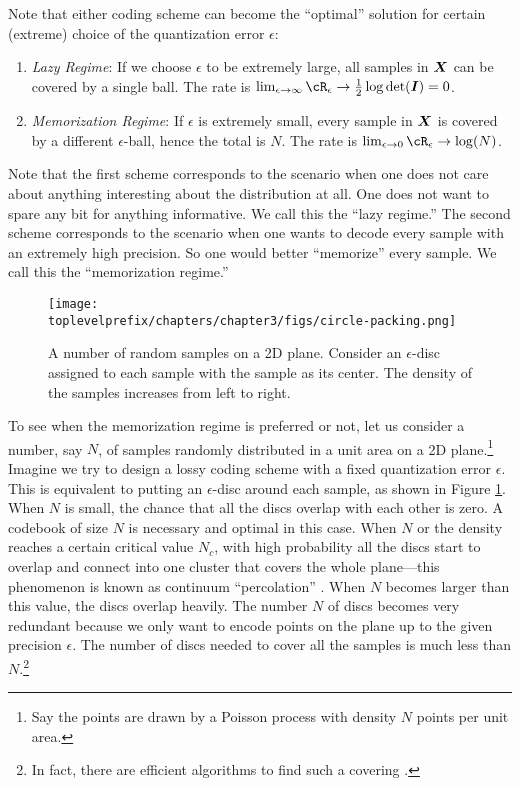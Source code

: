 \documentclass[../../book-main.tex]{subfiles}
\begin{document}
Note that either coding scheme can become the ``optimal'' solution for certain (extreme) choice of the quantization error $\epsilon$:
\begin{enumerate}
	\item {\em Lazy Regime}: If we choose $\epsilon$ to be extremely large, all samples in $\bm{X}$ can be covered by a single ball. The rate is  $\lim_{\epsilon \rightarrow \infty} \cR_\epsilon \rightarrow \frac{1}{2}\log\det (\boldsymbol{I}) = 0$.
	\item {\em Memorization Regime}: If $\epsilon$ is extremely small, every sample in $\bm{X}$  is covered by a different $\epsilon$-ball, hence the total is $N$. The rate is $\lim_{\epsilon \rightarrow 0} \cR_\epsilon \rightarrow \log(N)$.
\end{enumerate}
Note that the first scheme corresponds to the scenario when one does not care about anything interesting about the distribution at all. One does not want to spare any bit for anything informative. We call this the ``lazy regime.'' The second scheme corresponds to the scenario when one wants to decode every sample with an extremely high precision. So one would better ``memorize'' every sample. We call this the ``memorization regime.''
\begin{figure}
	\centering
	\texttt{[image: \\toplevelprefix/chapters/chapter3/figs/circle-packing.png]}
	\caption{A number of random samples on a 2D plane. Consider an $\epsilon$-disc assigned to each sample with the sample as its center. The density of the samples increases from left to right.}
	\label{fig:circle-packing}
\end{figure}
\begin{example}
	To see when the memorization regime is preferred or not, let us consider a number, say $N$, of samples randomly distributed in a unit area on a 2D plane.\footnote{Say the points are drawn by a Poisson process with density $N$ points per unit area.} Imagine we try to design a lossy coding scheme with a fixed quantization error $\epsilon$. This is equivalent to putting an $\epsilon$-disc around each sample, as shown in Figure \ref{fig:circle-packing}. When $N$ is small, the chance that all the discs overlap with each other is zero. A codebook of size $N$ is necessary and optimal in this case. When $N$ or the density reaches a certain critical value $N_c$, with high probability all the discs start to overlap and connect into one cluster that covers the whole plane---this phenomenon is known as continuum ``percolation'' \cite{Gilbert-1961,Mertens-Moore-2012}. When $N$ becomes larger than this value, the discs overlap heavily. The number $N$ of discs becomes very redundant because we only want to encode points on the plane up to the given precision $\epsilon$. The number of discs needed to cover all the samples is much less than $N$.\footnote{In fact, there are efficient algorithms to find such a covering \cite{Booth-2001}.}
\end{example}
\end{document}
